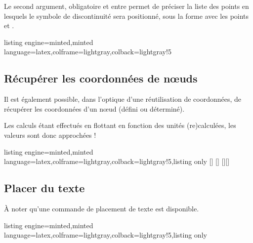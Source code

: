 \documentclass[11pt,a4paper]{ltxdoc}
\begin{document}
Le second argument, obligatoire et entre  permet de préciser la liste des points en lesquels le symbole de discontinuité sera positionné, sous la forme  avec les points  et .

\begin{tcblisting}{listing engine=minted,minted language=latex,colframe=lightgray,colback=lightgray!5}
\begin{GraphiqueTikz}[x=1cm,y=1cm,Xmin=0,Xmax=10,Ymin=0,Ymax=5]
\end{GraphiqueTikz}
\end{tcblisting}

\subsection{Récupérer les coordonnées de nœuds}\label{recupcoordo}

Il est également possible, dans l'optique d'une réutilisation de coordonnées, de récupérer les coordonnées d'un nœud (défini ou déterminé).

\smallskip

Les calculs étant effectués en flottant en fonction des unités (re)calculées, les valeurs sont donc approchées !

\begin{tcblisting}{listing engine=minted,minted language=latex,colframe=lightgray,colback=lightgray!5,listing only}
[\macrox]
[\macroy]
[\macrox][\macroy]
\end{tcblisting}

\subsection{Placer du texte}\label{placetxt}

À noter qu'une commande de placement de texte est disponible.

\begin{tcblisting}{listing engine=minted,minted language=latex,colframe=lightgray,colback=lightgray!5,listing only}
\end{tcblisting}
\end{document}
